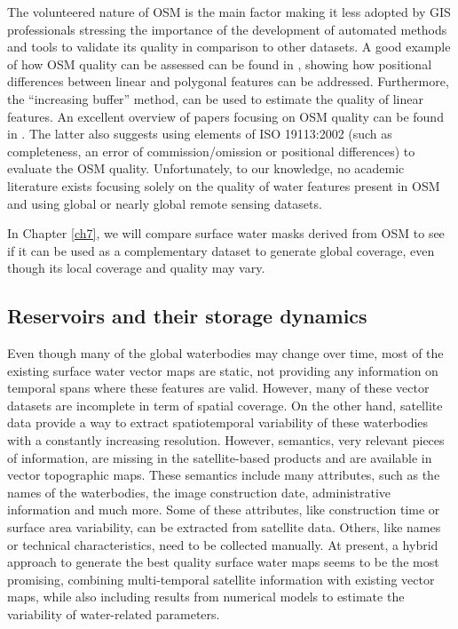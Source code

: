 The volunteered nature of OSM is the main factor making it less adopted by GIS professionals \citep{Mooney2010} stressing the importance of the development of automated methods and tools to validate its quality in comparison to other datasets. A good example of how OSM quality can be assessed can be found in \citep{Girres2010}, showing how positional differences between linear and polygonal features can be addressed. Furthermore, the “increasing buffer” method, \citep{Goodchild1997} can be used to estimate the quality of linear features. An excellent overview of papers focusing on OSM quality can be found in \citep{Barron2014}. The latter also suggests using elements of ISO 19113:2002 \citep{iso2002} (such as completeness, an error of commission/omission or positional differences) to evaluate the OSM quality. Unfortunately, to our knowledge, no academic literature exists focusing solely on the quality of water features present in OSM and using global or nearly global remote sensing datasets.

In Chapter \ref{ch7}, we will compare surface water masks derived from OSM to see if it can be used as a complementary dataset to generate global coverage, even though its local coverage and quality may vary.

\subsection{Reservoirs and their storage dynamics}
Even though many of the global waterbodies may change over time, most of the existing surface water vector maps are static, not providing any information on temporal spans where these features are valid. However, many of these vector datasets are incomplete in term of spatial coverage. On the other hand, satellite data provide a way to extract spatiotemporal variability of these waterbodies with a constantly increasing resolution. However, semantics, very relevant pieces of information, are missing in the satellite-based products and are available in vector topographic maps. These semantics include many attributes, such as the names of the waterbodies, the image construction date, administrative information and much more. Some of these attributes, like construction time or surface area variability, can be extracted from satellite data. Others, like names or technical characteristics, need to be collected manually. At present, a hybrid approach to generate the best quality surface water maps seems to be the most promising, combining multi-temporal satellite information with existing vector maps, while also including results from numerical models to estimate the variability of water-related parameters.

